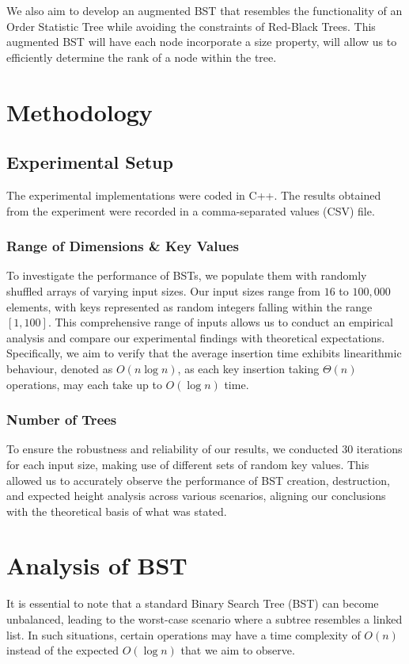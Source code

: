 \documentclass[a4paper,twoside,12pt]{report}
\begin{document}
We also aim to develop an augmented BST that resembles the functionality of an Order Statistic Tree while avoiding the constraints of Red-Black Trees. This augmented BST will have each node incorporate a size property, will allow us to efficiently determine the rank of a node within the tree.

\chapter{Methodology}
\section{Experimental Setup}
The experimental implementations were coded in C++. The results obtained from the experiment were recorded in a comma-separated values (CSV) file.
\subsection{Range of Dimensions \& Key Values}
To investigate the performance of BSTs, we populate them with randomly shuffled arrays of varying input sizes. Our input sizes range from $16$ to $100,000$ elements, with keys represented as random integers falling within the range $[1, 100]$. This comprehensive range of inputs allows us to conduct an empirical analysis and compare our experimental findings with theoretical expectations. Specifically, we aim to verify that the average insertion time exhibits linearithmic behaviour, denoted as $O(n \log n)$, as each key insertion taking $\Theta(n)$ operations, may each take up to $O(\log n)$ time.

\subsection{Number of Trees}
To ensure the robustness and reliability of our results, we conducted 30 iterations for each input size, making use of different sets of random key values. This allowed us to accurately observe the performance of BST creation, destruction, and expected height analysis across various scenarios, aligning our conclusions with the theoretical basis of what was stated.

\chapter{Analysis of BST}
It is essential to note that a standard Binary Search Tree (BST) can become unbalanced, leading to the worst-case scenario where a subtree resembles a linked list. In such situations, certain operations may have a time complexity of $O(n)$ instead of the expected $O(\log n)$ that we aim to observe.
\end{document}
